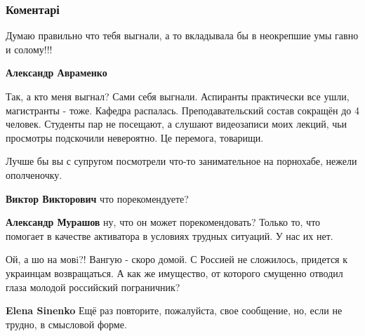  
 
 
 
 
\subsubsection{Коментарі}
\label{sec:30_11_2021.fb.bilchenko_evgenia.1.novyje_filmy.cmt}

\begin{itemize} %
Думаю правильно что тебя выгнали, а то вкладывала бы в неокрепшие умы гавно и солому!!!

\begin{itemize} %

\textbf{Александр Авраменко} 

Так, а кто меня выгнал? Сами себя выгнали. Аспиранты
практически все ушли, магистранты - тоже. Кафедра распалась.
Преподавательский состав сокращён до 4 человек. Студенты пар не
посещают, а слушают видеозаписи моих лекций, чьи просмотры
подскочили невероятно. Це перемога, товарищи.

\end{itemize} %

Лучше бы вы с супругом посмотрели что-то занимательное на порнохабе, нежели ополченочку.

\begin{itemize} %
\textbf{Виктор Викторович} что порекомендуете?


\textbf{Александр Мурашов} ну, что он может порекомендовать? Только то, что помогает в качестве активатора в условиях трудных ситуаций. У нас их нет.
\end{itemize} %


Ой, а шо на мовi?! Вангую - скоро домой. С Россией не сложилось, придется к
украинцам возвращаться. А как же имущество, от которого смущенно отводил глаза
молодой российский пограничник?

\begin{itemize} %
\textbf{Elena Sinenko} Ещё раз повторите, пожалуйста, свое сообщение, но, если не трудно, в смысловой форме.


\end{itemize}
\end{itemize}

